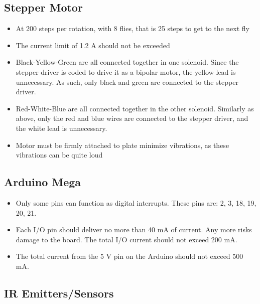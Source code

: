 \documentclass[12pt]{article}
\begin{document}
\subsection{Stepper Motor}
\begin{itemize}
	\item At 200 steps per rotation, with 8 flies, that is 25 steps to get to the next fly
	\item The current limit of 1.2 A should not be exceeded
	\item Black-Yellow-Green are all connected together in one solenoid. Since the stepper driver is coded to drive it as a bipolar motor, the yellow lead is unnecessary. As such, only black and green are connected to the stepper driver.
	\item Red-White-Blue are all connected together in the other solenoid. Similarly as above, only the red and blue wires are connected to the stepper driver, and the white lead is unnecessary.
	\item Motor must be firmly attached to plate minimize vibrations, as these vibrations can be quite loud	
\end{itemize}

\subsection{Arduino Mega}
\begin{itemize}
	\item Only some pins can function as digital interrupts. These pins are: 2, 3, 18, 19, 20, 21.
	\item Each I/O pin should deliver no more than 40 mA of current. Any more risks damage to the board. The total I/O current should not exceed 200 mA.
	\item The total current from the 5 V pin on the Arduino should not exceed 500 mA.
\end{itemize}

\subsection{IR Emitters/Sensors}
\end{document}
